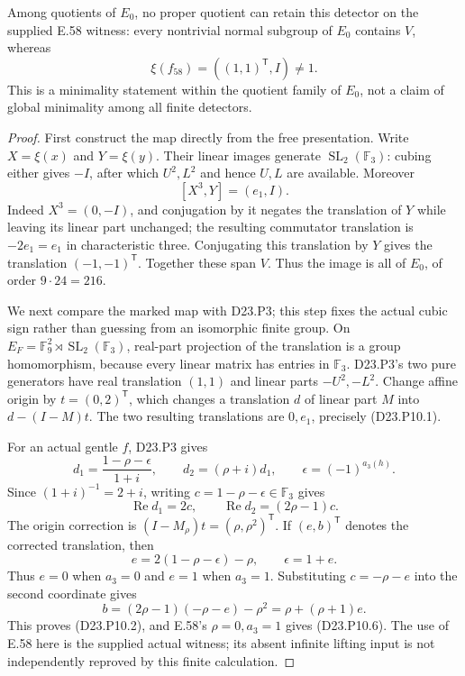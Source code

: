 Among quotients of $E_0$, no proper quotient can retain this
detector on the supplied E.58 witness: every nontrivial normal
subgroup of $E_0$ contains $V$, whereas
\[
       \xi(f_{58})=((1,1)^{\mathsf T},I)\ne1.
\tag{D23.P10.6}
\]
This is a minimality statement within the quotient family of
$E_0$, not a claim of global minimality among all finite detectors.

\begin{proof}
First construct the map directly from the free presentation.
Write $X=\xi(x)$ and $Y=\xi(y)$. Their linear images generate
$\operatorname{SL}_2(\mathbb F_3)$: cubing either gives $-I$,
after which $U^2,L^2$ and hence $U,L$ are available. Moreover
\[
              [X^3,Y]=(e_1,I).
\]
Indeed $X^3=(0,-I)$, and conjugation by it negates the
translation of $Y$ while leaving its linear part unchanged;
the resulting commutator translation is $-2e_1=e_1$ in
characteristic three. Conjugating this translation by $Y$
gives the translation $(-1,-1)^{\mathsf T}$. Together these
span $V$. Thus the image is all of $E_0$, of order $9\cdot24=216$.

We next compare the marked map with D23.P3; this step fixes
the actual cubic sign rather than guessing from an isomorphic
finite group. On $E_F=\mathbb F_9^2\rtimes\operatorname{SL}_2(\mathbb F_3)$,
real-part projection of the translation is a group homomorphism,
because every linear matrix has entries in $\mathbb F_3$.
D23.P3's two pure generators have real translation $(1,1)$
and linear parts $-U^2,-L^2$. Change affine origin by
$t=(0,2)^{\mathsf T}$, which changes a translation $d$ of
linear part $M$ into $d-(I-M)t$. The two resulting translations
are $0,e_1$, precisely (D23.P10.1).

For an actual gentle $f$, D23.P3 gives
\[
 d_1=\frac{1-\rho-\epsilon}{1+i},\qquad
 d_2=(\rho+i)d_1,\qquad \epsilon=(-1)^{a_3(h)}.
\]
Since $(1+i)^{-1}=2+i$, writing
$c=1-\rho-\epsilon\in\mathbb F_3$ gives
\[
 \operatorname{Re}d_1=2c,\qquad
 \operatorname{Re}d_2=(2\rho-1)c.
\]
The origin correction is $(I-M_\rho)t=(\rho,\rho^2)^{\mathsf T}$.
If $(e,b)^{\mathsf T}$ denotes the corrected translation, then
\[
 e=2(1-\rho-\epsilon)-\rho,\qquad \epsilon=1+e.
\]
Thus $e=0$ when $a_3=0$ and $e=1$ when $a_3=1$.
Substituting $c=-\rho-e$ into the second coordinate gives
\[
 b=(2\rho-1)(-\rho-e)-\rho^2=\rho+(\rho+1)e.
\]
This proves (D23.P10.2), and E.58's $\rho=0,a_3=1$ gives
(D23.P10.6). The use of E.58 here is the supplied actual
witness; its absent infinite lifting input is not independently
reproved by this finite calculation.


\end{proof}
